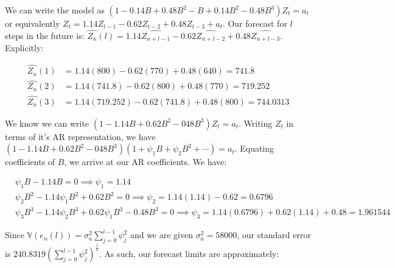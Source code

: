 \documentclass[12pt, letterpaper]{article}
\theoremstyle{definition}
\numberwithin{equation}{section}
\newcommand{\+}[1]{+_{\scalebox{.375}{#1}}}
\newcommand{\V}{\mathbb{V}}
\newcommand{\1}{\mathbbm{1}}
\begin{document}
\newpage
\noindent\textbf{}

\vspace{\baselineskip}
\noindent\textbf{}
\vspace{\baselineskip}

We can write the model as $(1-0.14B+0.48B^2-B+0.14B^2-0.48B^3)Z_t=a_t$ or equivalently $Z_t=1.14Z_{t-1}-0.62Z_{t-2}+0.48Z_{t-3}+a_t$. Our forecast for $l$ steps in the future is: $\widehat{Z_{n}}(l)=1.14\widehat{Z_{n+l-1}}-0.62\widehat{Z_{n+l-2}}+0.48\widehat{Z_{n+l-3}}$. Explicitly:

\vspace{-0.5cm}
\begin{align*}
	\widehat{Z_{n}}(1)&=1.14(800)-0.62(770)+0.48(640)=741.8\\
	\widehat{Z_{n}}(2)&=1.14(741.8)-0.62(800)+0.48(770)=719.252\\
	\widehat{Z_{n}}(3)&=1.14(719.252)-0.62(741.8)+0.48(800)=744.0313
\end{align*}	
\vspace{-0.75cm}


\vspace{\baselineskip}
\noindent\textbf{}
\vspace{\baselineskip}

We know we can write $(1-1.14B+0.62B^2-048B^3)Z_t=a_t$. Writing $Z_t$ in terms of it's AR representation, we have $(1-1.14B+0.62B^2-048B^3)(1+\psi_1B+\psi_2B^2+\cdots)=a_t$. Equating coefficients of $B$, we arrive at our AR coefficients. We have:

\vspace{-0.5cm}
\begin{align*}
	&\psi_1B-1.14B=0 \implies \psi_1=1.14\\
	&\psi_2B^2-1.14\psi_1B^2+0.62B^2=0 \implies  \psi_2=1.14(1.14)-0.62=0.6796\\
	&\psi_3B^3-1.14\psi_2B^3+0.62\psi_1B^3-0.48B^3=0 \implies  \psi_3=1.14(0.6796)+0.62(1.14)+0.48=1.961544
\end{align*}

Since $\V(e_n(l))=\sigma_a^2\sum\limits_{j=0}^{l-1}\psi_j^2$ and we are given $\sigma_a^2=58000$, our standard error is $240.8319\left(\sum\limits_{j=0}^{l-1}\psi_j^2\right)^{\frac{1}{2}}$. As such, our forecast limits are approximately:
\end{document}
